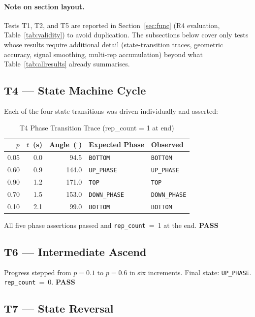 \documentclass[12pt, titlepage]{article}
\newcommand{\ppass}{\textcolor{green!60!black}{\textbf{PASS}}}
\begin{document}
\paragraph{Note on section layout.}
Tests T1, T2, and T5 are reported in Section~\ref{sec:func} (R4 evaluation,
Table~\ref{tab:validity}) to avoid duplication. The subsections below cover
only tests whose results require additional detail (state-transition traces,
geometric accuracy, signal smoothing, multi-rep accumulation) beyond what
Table~\ref{tab:allresults} already summarises.

\subsection{T4 --- State Machine Cycle}
\label{sub:t4}

Each of the four state transitions was driven individually and asserted:

\begin{table}[H]
\centering
\begin{tabular}{r r r l l}
\toprule
$p$ & $t$~(s) & Angle~($^\circ$) & Expected Phase & Observed\\
\midrule
0.05 & 0.0 & 94.5  & \texttt{BOTTOM}     & \texttt{BOTTOM}     \\
0.60 & 0.9 & 144.0 & \texttt{UP\_PHASE}  & \texttt{UP\_PHASE}  \\
0.90 & 1.2 & 171.0 & \texttt{TOP}        & \texttt{TOP}        \\
0.70 & 1.5 & 153.0 & \texttt{DOWN\_PHASE}& \texttt{DOWN\_PHASE}\\
0.10 & 2.1 & 99.0  & \texttt{BOTTOM}     & \texttt{BOTTOM}     \\
\bottomrule
\end{tabular}
\caption{T4 Phase Transition Trace (rep\_count = 1 at end)}
\label{tab:t4}
\end{table}

All five phase assertions passed and \texttt{rep\_count}~=~1 at the end. \ppass

\subsection{T6 --- Intermediate Ascend}

Progress stepped from $p{=}0.1$ to $p{=}0.6$ in six increments.
Final state: \texttt{UP\_PHASE}. \texttt{rep\_count}~=~0. \ppass

\subsection{T7 --- State Reversal}
\end{document}
